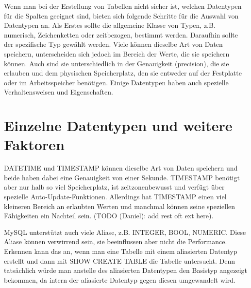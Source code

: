 Wenn man bei der Erstellung von Tabellen nicht sicher ist, welchen Datentypen für die Spalten geeignet sind, bieten sich folgende Schritte für die Auswahl von Datentypen an.
Als Erstes sollte die allgemeine Klasse von Typen, z.B. numerisch, Zeichenketten oder zeitbezogen, bestimmt werden.
Daraufhin sollte der spezifische Typ gewählt werden.
Viele können dieselbe Art von Daten speichern, unterscheiden sich jedoch im Bereich der Werte, die sie speichern können.
Auch sind sie unterschiedlich in der Genauigkeit (precision), die sie erlauben und dem physischen Speicherplatz, den sie entweder auf der Festplatte oder im Arbeitsspeicher benötigen.
Einige Datentypen haben auch spezielle Verhaltensweisen und Eigenschaften.

\section{Einzelne Datentypen und weitere Faktoren}
DATETIME und TIMESTAMP können dieselbe Art von Daten speichern und beide haben dabei eine Genauigkeit von einer Sekunde.
TIMESTAMP benötigt aber nur halb so viel Speicherplatz, ist zeitzonenbewusst und verfügt über spezielle Auto-Update-Funktionen.
Allerdings hat TIMESTAMP einen viel kleineren Bereich an erlaubten Werten und manchmal können seine speziellen Fähigkeiten ein Nachteil sein.
(TODO (Daniel): add rest oft ext here).

MySQL unterstützt auch viele Aliase, z.B. INTEGER, BOOL, NUMERIC.
Diese Aliase können verwirrend sein, sie beeinflussen aber nicht die Performance.
Erkennen kann das an, wenn man eine Tabelle mit einem aliasierten Datentyp erstellt und dann mit SHOW CREATE TABLE die Tabelle untersucht.
Denn tatsächlich würde man anstelle des aliasierten Datentypen den Basistyp angezeigt bekommen, da intern der aliasierte Datentyp gegen diesen umgewandelt wird.


